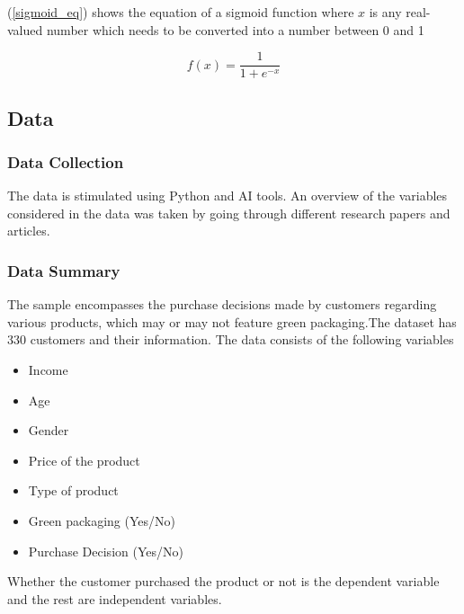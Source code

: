 \documentclass[a4paper,10pt]{article}
\begin{document}
(\ref{sigmoid_eq}) shows the equation of a sigmoid function where $x$ is any real-valued number which needs to be converted into a number between 0 and 1

\begin{equation}
f(x) = \frac{1}{1 + e^{-x}}
\label{sigmoid_eq}
\end{equation}

\subsection{Data}
\subsubsection{Data Collection}

The data is stimulated using Python and AI tools. An overview of the variables considered in the data was taken by going through different research papers and articles. 

\subsubsection{Data Summary}
The sample encompasses the purchase decisions made by customers regarding various products, which may or may not feature green packaging.The dataset has 330 customers and their information. 
The data consists of the following variables
\begin{itemize}

    \item Income 
    \item Age 
    \item Gender 
    \item Price of the product
    \item Type of product
    \item Green packaging (Yes/No)
    \item Purchase Decision (Yes/No)
\end{itemize}

Whether the customer purchased the product or not is the dependent variable and the rest are independent variables. 
\end{document}
